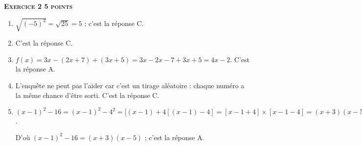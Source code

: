 \textbf{\textsc{Exercice 2 \hfill 5 points}}

\medskip

\begin{enumerate}
\item $\sqrt{(- 5)^2} = \sqrt{25} = 5$ ; c’est la réponse C.
\item  C'est la réponse C.
\item  $f(x)= 3x - (2x + 7) + (3x + 5) = 3x - 2x- 7 + 3x + 5 = 4x - 2$. C’est la réponse A.
\item  L'enquête ne peut pas l’aider car c’est un tirage aléatoire : chaque numéro a la même chance d'être sorti. C’est la réponse C.
\item $(x - 1)^2 −16 = (x - 1)^2 - 4^2 =[(x - 1) + 4[(x - 1) − 4]  = [x - 1+4] \times [x - 1 - 4] = (x + 3)(x - 5)$.

D’où $(x - 1)^2 - 16 = (x + 3)(x - 5)$ ; c’est la réponse A.
\end{enumerate}
 
\vspace{0,5cm}


